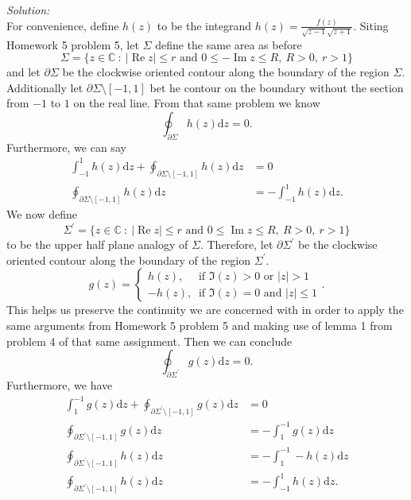 \documentclass[10pt]{amsart}
\newcommand{\D}{\mathrm{d}}
\DeclareMathOperator{\real}{Re}
\DeclareMathOperator{\imag}{Im}
\theoremstyle{nonumberplain}
\begin{document}
\begin{enumerate}[label={\bf {\arabic*}:}]
\begin{enumerate}
\noindent
\textit{Solution:} \\
For convenience, define $h(z)$ to be the integrand $h(z) = \frac{f(z)}{\sqrt{z -1} \sqrt{z + 1}}$.
Siting Homework 5 problem 5, let $\Sigma$ define the same area as before
$$\Sigma = \{z \in \mathbb C ~:~ |\real z | \leq r \text{ and } 0 \leq -\imag z \leq R, ~ R > 0, ~ r > 1\}$$
and let $\partial \Sigma$ be the clockwise oriented contour along the boundary of the region $\Sigma$.
Additionally let $\partial \Sigma \setminus [-1, 1]$ bet he contour on the boundary without the section from $-1$ to $1$ on the real line.
From that same problem we know 
$$
\oint_{\partial \Sigma} h(z) \D z = 0.
$$
Furthermore, we can say
\begin{align}
\int_{-1}^{1} h(z) \D z + \oint_{\partial \Sigma \setminus [-1, 1]} h(z) \D z &= 0 \nonumber \\
\oint_{\partial \Sigma \setminus [-1, 1]} h(z) \D z &= -\int_{-1}^{1} h(z) \D z.
\label{eq:lower_rectangle}
\end{align}
We now define
$$ \Sigma^\prime = \{z \in \mathbb C ~:~ |\real z | \leq r \text{ and } 0 \leq \imag z \leq R, ~ R > 0, ~ r > 1\} $$
to be the upper half plane analogy of $\Sigma$.
Therefore, let $\partial \Sigma^\prime$ be the clockwise oriented contour along the boundary of the region $\Sigma^\prime$.
$$
g(z) = \begin{cases}
h(z), \quad \text{ if } \Im(z) > 0 \text{ or } |z| > 1 \\
- h(z), \: \text{ if } \Im(z) = 0 \text{ and } |z| \leq 1
\end{cases}.
$$
This helps us preserve the continuity we are concerned with in order to apply the same arguments from Homework 5 problem 5 and making use of lemma 1 from problem 4 of that same assignment.
Then we can conclude
$$\oint_{\partial \Sigma^\prime} g(z) \D z =  0. $$
Furthermore, we have
\begin{align}
\int_{1}^{-1} g(z) \D z + \oint_{\partial \Sigma^\prime\setminus[-1,1]} g(z) \D z &= 0 \nonumber \\
	\oint_{\partial \Sigma^\prime\setminus[-1,1]} g(z) \D z &= - \int_{1}^{-1} g(z) \D z \nonumber \\
	\oint_{\partial \Sigma^\prime\setminus[-1,1]} h(z) \D z &= - \int_{1}^{-1} -h(z) \D z \nonumber \\
	\oint_{\partial \Sigma^\prime\setminus[-1,1]} h(z) \D z &= - \int_{-1}^{1} h(z) \D z.
\label{eq:upper_rectangle}
\end{align}


\end{enumerate}
\end{enumerate}
\end{document}
